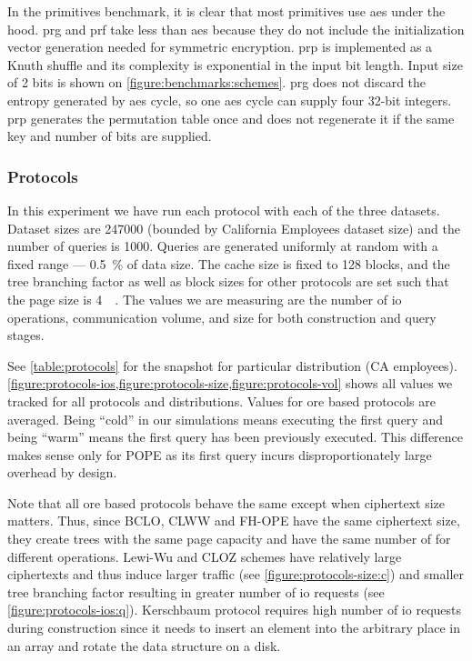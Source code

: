 			In the primitives benchmark, it is clear that most primitives use \acrshort{aes} under the hood.
			\acrshort{prg} and \acrshort{prf} take less than \acrshort{aes} because they do not include the initialization vector generation needed for symmetric encryption.
			\acrshort{prp} is implemented as a Knuth shuffle \cite{knuth-shuffle} and its complexity is exponential in the input bit length.
			Input size of 2 bits is shown on \cref{figure:benchmarks:schemes}.
			\acrshort{prg} does not discard the entropy generated by \acrshort{aes} cycle, so one \acrshort{aes} cycle can supply four 32-bit integers.
			\acrshort{prp} generates the permutation table once and does not regenerate it if the same key and number of bits are supplied.

		\subsubsection{Protocols}\label{section:range-snapshot:results-protocols}

			In this experiment we have run each protocol with each of the three datasets.
			Dataset sizes are \num{247000} (bounded by California Employees dataset size) and the number of queries is \num{1000}.
			Queries are generated uniformly at random with a fixed range --- \SI{0.5}{\percent} of data size.
			The cache size is fixed to \num{128} blocks, and the {\BPlus} tree branching factor as well as block sizes for other protocols are set such that the page size is \SI{4}{\kibi\byte}.
			The values we are measuring are the number of \acrshort{io} operations, communication volume, and size for both construction and query stages.

			See \cref{table:protocols} for the snapshot for particular distribution (CA employees).
			\cref{figure:protocols-ios,figure:protocols-size,figure:protocols-vol} shows all values we tracked for all protocols and distributions.
			Values for \acrshort{ore} based protocols are averaged.
			Being ``cold'' in our simulations means executing the first query and being ``warm'' means the first query has been previously executed.
			This difference makes sense only for POPE as its first query incurs disproportionately large overhead by design.

			Note that all \acrshort{ore} based protocols behave the same except when ciphertext size matters.
			Thus, since BCLO, CLWW and FH-OPE have the same ciphertext size, they create {\BPlus} trees with the same page capacity and have the same number of  for different operations.
			Lewi-Wu and CLOZ schemes have relatively large ciphertexts and thus induce larger traffic (see \cref{figure:protocols-size:c}) and smaller {\BPlus} tree branching factor resulting in greater number of \acrshort{io} requests (see \cref{figure:protocols-ios:q}).
			Kerschbaum protocol requires high number of \acrshort{io} requests during construction since it needs to insert an element into the arbitrary place in an array and rotate the data structure on a disk.


